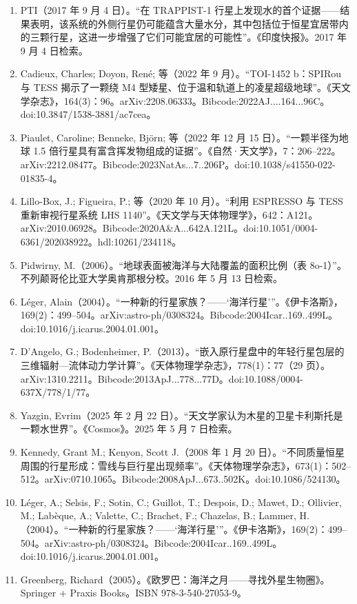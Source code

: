 \begin{enumerate}
\item PTI（2017 年 9 月 4 日）。“在 TRAPPIST-1 行星上发现水的首个证据——结果表明，该系统的外侧行星仍可能蕴含大量水分，其中包括位于恒星宜居带内的三颗行星，这进一步增强了它们可能宜居的可能性”。《印度快报》。2017 年 9 月 4 日检索。
\item Cadieux, Charles; Doyon, René; 等（2022 年 9 月）。“TOI-1452 b：SPIRou 与 TESS 揭示了一颗绕 M4 型矮星、位于温和轨道上的凌星超级地球”。《天文学杂志》，164(3)：96。arXiv:2208.06333。Bibcode:2022AJ....164...96C。doi:10.3847/1538-3881/ac7cea。
\item Piaulet, Caroline; Benneke, Björn; 等（2022 年 12 月 15 日）。“一颗半径为地球 1.5 倍行星具有富含挥发物组成的证据”。《自然·天文学》，7：206–222。arXiv:2212.08477。Bibcode:2023NatAs...7..206P。doi:10.1038/s41550-022-01835-4。
\item Lillo-Box, J.; Figueira, P.; 等（2020 年 10 月）。“利用 ESPRESSO 与 TESS 重新审视行星系统 LHS 1140”。《天文学与天体物理学》，642：A121。arXiv:2010.06928。Bibcode:2020A&A...642A.121L。doi:10.1051/0004-6361/202038922。hdl:10261/234118。
\item Pidwirny, M.（2006）。“地球表面被海洋与大陆覆盖的面积比例（表 8o-1）”。不列颠哥伦比亚大学奥肯那根分校。2016 年 5 月 13 日检索。
\item Léger, Alain（2004）。“一种新的行星家族？——‘海洋行星’”。《伊卡洛斯》，169(2)：499–504。arXiv:astro-ph/0308324。Bibcode:2004Icar..169..499L。doi:10.1016/j.icarus.2004.01.001。
\item D'Angelo, G.; Bodenheimer, P.（2013）。“嵌入原行星盘中的年轻行星包层的三维辐射—流体动力学计算”。《天体物理学杂志》，778(1)：77（29 页）。arXiv:1310.2211。Bibcode:2013ApJ...778...77D。doi:10.1088/0004-637X/778/1/77。
\item Yazgin, Evrim（2025 年 2 月 22 日）。“天文学家认为木星的卫星卡利斯托是一颗水世界”。《Cosmos》。2025 年 5 月 7 日检索。
\item Kennedy, Grant M.; Kenyon, Scott J.（2008 年 1 月 20 日）。“不同质量恒星周围的行星形成：雪线与巨行星出现频率”。《天体物理学杂志》，673(1)：502–512。arXiv:0710.1065。Bibcode:2008ApJ...673..502K。doi:10.1086/524130。
\item Léger, A.; Selsis, F.; Sotin, C.; Guillot, T.; Despois, D.; Mawet, D.; Ollivier, M.; Labèque, A.; Valette, C.; Brachet, F.; Chazelas, B.; Lammer, H.（2004）。“一种新的行星家族？——‘海洋行星’”。《伊卡洛斯》，169(2)：499–504。arXiv:astro-ph/0308324。Bibcode:2004Icar..169..499L。doi:10.1016/j.icarus.2004.01.001。
\item Greenberg, Richard（2005）。《欧罗巴：海洋之月——寻找外星生物圈》。Springer + Praxis Books。ISBN 978-3-540-27053-9。

\end{enumerate}
